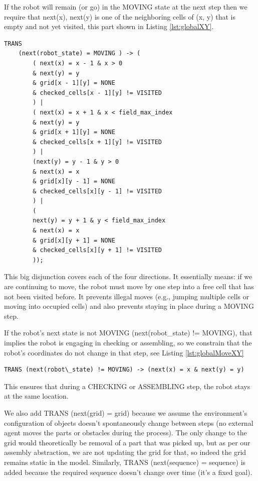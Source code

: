 If the robot will remain (or go) in the MOVING state at the next step
then we require that next(x), next(y) is one of the neighboring cells 
of (x, y) that is empty and not yet visited, this part shown  in Listing \ref{lst:globalXY}. 

\begin{lstlisting}[language=NuSMV, caption={Transition of x and y coordinates during MOVING}, 
    label={lst:globalXY}]
  TRANS 
    (next(robot_state) = MOVING ) -> (   
        ( next(x) = x - 1 & x > 0  
        & next(y) = y 
        & grid[x - 1][y] = NONE
        & checked_cells[x - 1][y] != VISITED
        ) |
        ( next(x) = x + 1 & x < field_max_index  
        & next(y) = y 
        & grid[x + 1][y] = NONE
        & checked_cells[x + 1][y] != VISITED 
        ) |
        (next(y) = y - 1 & y > 0 
        & next(x) = x 
        & grid[x][y - 1] = NONE
        & checked_cells[x][y - 1] != VISITED
        ) |
        (
        next(y) = y + 1 & y < field_max_index  
        & next(x) = x 
        & grid[x][y + 1] = NONE
        & checked_cells[x][y + 1] != VISITED 
        ));
\end{lstlisting}

 This big disjunction covers each of the four directions. 
 It essentially means: if we are continuing to move, the robot must move 
 by one step into a free cell that has not been visited before. 
It prevents illegal moves (e.g., jumping multiple cells or moving into occupied cells) and also 
 prevents staying in place during a MOVING step.

If the robot's next state is not MOVING (next(robot\_state) != MOVING), 
that implies the robot is engaging in checking or assembling, so we 
constrain that the robot’s coordinates do not change in that step, see Listing \ref{lst:globalMoveXY}

\begin{lstlisting}[language=NuSMV, caption={Condition that robot position doesnt change if not MOVING}, 
    label={lst:globalMoveXY}]
    TRANS (next(robot\_state) != MOVING) -> (next(x) = x & next(y) = y)
\end{lstlisting}

This ensures that during a CHECKING or ASSEMBLING step, the robot stays at the same 
location.

We also add TRANS (next(grid) = grid) because we assume the environment's
configuration of objects doesn't spontaneously change between steps 
(no external agent moves the parts or obstacles during the process). 
The only change to the grid would theoretically 
be removal of a part that was picked up, but as per our assembly abstraction,
we are not updating the grid for that, so indeed the grid remains static 
in the model. Similarly, TRANS (next(sequence) = sequence) is added because 
the required sequence doesn’t change over time (it's a fixed goal).


